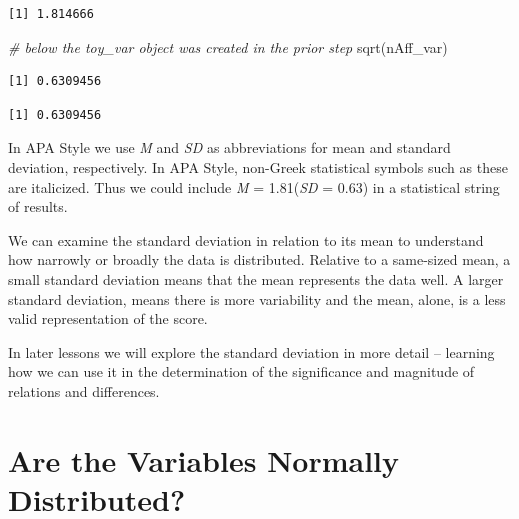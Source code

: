 \documentclass[
  11pt,
]{book}
\newenvironment{Shaded}{\begin{snugshade}}{\end{snugshade}}
\newcommand{\CommentTok}[1]{\textcolor[rgb]{0.56,0.35,0.01}{\textit{#1}}}
\newcommand{\FunctionTok}[1]{\textcolor[rgb]{0.00,0.00,0.00}{#1}}
\newcommand{\NormalTok}[1]{#1}
\newcommand{\SpecialCharTok}[1]{\textcolor[rgb]{0.00,0.00,0.00}{#1}}
\begin{document}
\begin{verbatim}
[1] 1.814666
\end{verbatim}

\begin{Shaded}
\begin{Highlighting}[]
\CommentTok{\# below the \textquotesingle{}toy\_var\textquotesingle{} object was created in the prior step}
\FunctionTok{sqrt}\NormalTok{(nAff\_var)}
\end{Highlighting}
\end{Shaded}

\begin{verbatim}
[1] 0.6309456
\end{verbatim}

\begin{Shaded}
\end{Shaded}

\begin{verbatim}
[1] 0.6309456
\end{verbatim}

In APA Style we use \emph{M} and \emph{SD} as abbreviations for mean and standard deviation, respectively. In APA Style, non-Greek statistical symbols such as these are italicized. Thus we could include \emph{M} = 1.81(\emph{SD} = 0.63) in a statistical string of results.

We can examine the standard deviation in relation to its mean to understand how narrowly or broadly the data is distributed. Relative to a same-sized mean, a small standard deviation means that the mean represents the data well. A larger standard deviation, means there is more variability and the mean, alone, is a less valid representation of the score.

In later lessons we will explore the standard deviation in more detail -- learning how we can use it in the determination of the significance and magnitude of relations and differences.

\hypertarget{are-the-variables-normally-distributed}{%
\section{Are the Variables Normally Distributed?}\label{are-the-variables-normally-distributed}}
\end{document}
